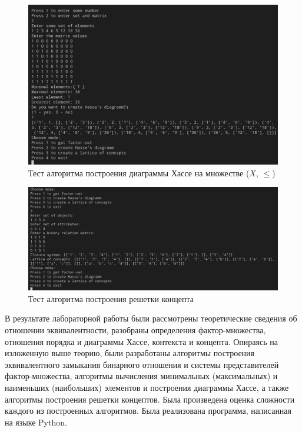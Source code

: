 \documentclass[bachelor, och, labwork]{shiza}
\begin{document}
        \begin{figure}[H]
            \centering
            \includegraphics[width=1\textwidth]{photo/3.png}
            \caption{Тест алгоритма построения диаграммы Хассе на множестве ($X$, $\leq$)}
        \end{figure}

        \begin{figure}[H]
            \centering
            \includegraphics[width=1\textwidth]{photo/4.png}
            \caption{Тест алгоритма построения решетки концепта}
        \end{figure} 
    \newpage
 
    \conclusion
    
    В результате лабораторной работы были рассмотрены теоретические сведения об отношении эквивалентности, разобраны
    определения фактор-множества, отношения порядка и диаграммы Хассе, контекста и концепта. Опираясь на изложенную
    выше теорию, были разработаны алгоритмы построения эквивалентного замыкания бинарного отношения и системы представителей
    фактор-множества, алгоритмы вычисления минимальных (максимальных) и наименьших (наибольших) элементов и построения
    диаграммы Хассе, а также алгоритмы построения решетки концептов. Была произведена оценка сложности каждого из 
    построенных алгоритмов. Была реализована программа, написанная на языке Python.
    
\end{document}
